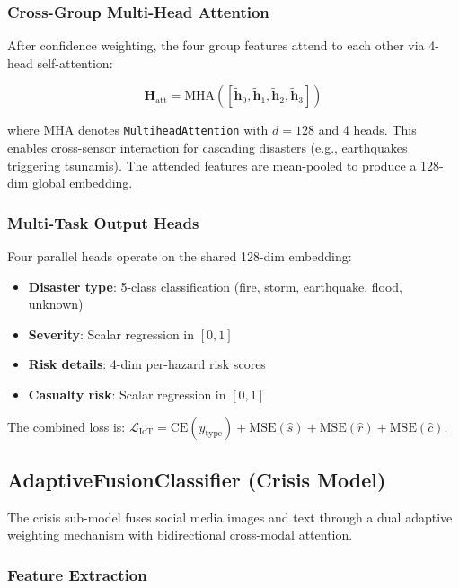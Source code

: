 \documentclass[journal]{IEEEtran}
\begin{document}
\subsubsection{Cross-Group Multi-Head Attention}

After confidence weighting, the four group features attend to each other via 4-head self-attention:

\begin{equation}
\mathbf{H}_\text{att} = \text{MHA}([\tilde{\mathbf{h}}_0, \tilde{\mathbf{h}}_1, \tilde{\mathbf{h}}_2, \tilde{\mathbf{h}}_3])
\end{equation}

where $\text{MHA}$ denotes \texttt{MultiheadAttention} with $d=128$ and 4 heads. This enables cross-sensor interaction for cascading disasters (e.g., earthquakes triggering tsunamis). The attended features are mean-pooled to produce a 128-dim global embedding.

\subsubsection{Multi-Task Output Heads}

Four parallel heads operate on the shared 128-dim embedding:

\begin{itemize}
    \item \textbf{Disaster type}: 5-class classification (fire, storm, earthquake, flood, unknown)
    \item \textbf{Severity}: Scalar regression in $[0, 1]$
    \item \textbf{Risk details}: 4-dim per-hazard risk scores
    \item \textbf{Casualty risk}: Scalar regression in $[0, 1]$
\end{itemize}

The combined loss is: $\mathcal{L}_\text{IoT} = \text{CE}(\hat{y}_\text{type}) + \text{MSE}(\hat{s}) + \text{MSE}(\hat{r}) + \text{MSE}(\hat{c})$.

\subsection{AdaptiveFusionClassifier (Crisis Model)}

The crisis sub-model fuses social media images and text through a dual adaptive weighting mechanism with bidirectional cross-modal attention.

\subsubsection{Feature Extraction}
\end{document}
